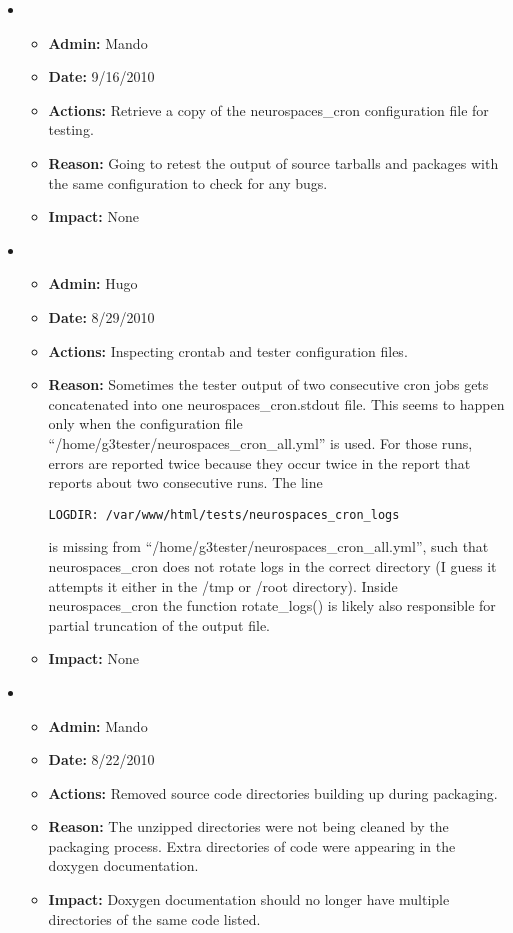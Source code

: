 \documentclass[12pt]{article}
\begin{document}
\begin{itemize}
\item 
\begin{itemize}
\item[] {\bf Admin:} Mando
\item[] {\bf Date:} 9/16/2010 
\item[] {\bf Actions:} Retrieve a copy of the neurospaces\_cron configuration file for testing.
\item[] {\bf Reason:} Going to retest the output of source tarballs and packages with the same configuration to check for any bugs.
\item[] {\bf Impact:} None
\end{itemize}
	
\item 
\begin{itemize}
\item[] {\bf Admin:} Hugo
\item[] {\bf Date:} 8/29/2010 
\item[] {\bf Actions:} Inspecting crontab and tester configuration
  files.
\item[] {\bf Reason:} Sometimes the tester output of two consecutive
  cron jobs gets concatenated into one neurospaces\_cron.stdout file.
  This seems to happen only when the configuration file
  ``/home/g3tester/neurospaces\_cron\_all.yml'' is used.  For those
  runs, errors are reported twice because they occur twice in the
  report that reports about two consecutive runs.
  The line
\begin{verbatim}
LOGDIR: /var/www/html/tests/neurospaces_cron_logs
\end{verbatim}
  is missing from ``/home/g3tester/neurospaces\_cron\_all.yml'', such
  that neurospaces\_cron does not rotate logs in the correct directory
  (I guess it attempts it either in the /tmp or /root directory).
  Inside neurospaces\_cron the function rotate\_logs() is likely also
  responsible for partial truncation of the output file.
\item[] {\bf Impact:} None
\end{itemize}

\item 
\begin{itemize}
\item[] {\bf Admin:} Mando
\item[] {\bf Date:} 8/22/2010 
\item[] {\bf Actions:} Removed source code directories building up during packaging.
\item[] {\bf Reason:} The unzipped directories were not being cleaned by the packaging process. Extra directories of code were appearing in the doxygen documentation.
\item[] {\bf Impact:} Doxygen documentation should no longer have multiple directories of the same code listed.
\end{itemize}


\end{itemize}
\end{document}
